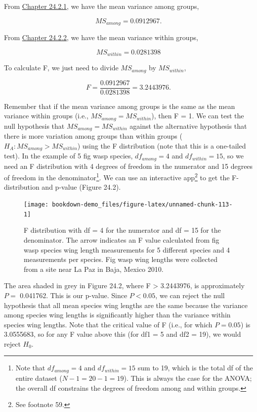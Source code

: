 \documentclass[
]{scrbook}
\begin{document}
From \protect\hyperlink{anova-mean-variance-among-groups}{Chapter 24.2.1}, we have the mean variance among groups,

\[MS_{among} = 0.0912967.\]

From \protect\hyperlink{anova-mean-variance-among-groups}{Chapter 24.2.2}, we have the mean variance within groups,

\[MS_{within} = 0.0281398\]

To calculate F, we just need to divide \(MS_{among}\) by \(MS_{within}\),

\[F = \frac{0.0912967}{0.0281398} = 3.2443976.\]

Remember that if the mean variance among groups is the same as the mean variance within groups (i.e., \(MS_{among} = MS_{within}\)), then F = 1.
We can test the null hypothesis that \(MS_{among} = MS_{within}\) against the alternative hypothesis that there is more variation among groups than within groups (\(H_{A}: MS_{among} > MS_{within}\)) using the F distribution (note that this is a one-tailed test).
In the example of 5 fig wasp species, \(df_{among} = 4\) and \(df_{within} = 15\),
so we need an F distribution with 4 degrees of freedom in the numerator and 15 degrees of freedom in the denominator\footnote{Note that \(df_{among} = 4\) and \(df_{within} = 15\) sum to 19, which is the total df of the entire dataset (\(N - 1 = 20 - 1 = 19\)). This is always the case for the ANOVA; the overall df constrains the degrees of freedom among and within groups.}.
We can use an interactive app\footnote{See footnote 59.} to get the F-distribution and p-value (Figure 24.2).

\begin{figure}
\texttt{[image: bookdown-demo\_files/figure-latex/unnamed-chunk-113-1]} \caption{F distribution with df = 4 for the numerator and df = 15 for the denominator. The arrow indicates an F value calculated from fig wasp species wing length measurements for 5 different species and 4 measurements per species. Fig wasp wing lengths were collected from a site near La Paz in Baja, Mexico 2010.}\label{fig:unnamed-chunk-113}
\end{figure}

The area shaded in grey in Figure 24.2, where F \textgreater{} 3.2443976, is approximately \(P =\) 0.041762.
This is our p-value.
Since \(P < 0.05\), we can reject the null hypothesis that all mean species wing lengths are the same because the variance among species wing lengths is significantly higher than the variance within species wing lengths.
Note that the critical value of F (i.e., for which \(P = 0.05\)) is 3.0555683, so for any F value above this (for df1 = 5 and df2 = 19), we would reject \(H_{0}\).
\end{document}
